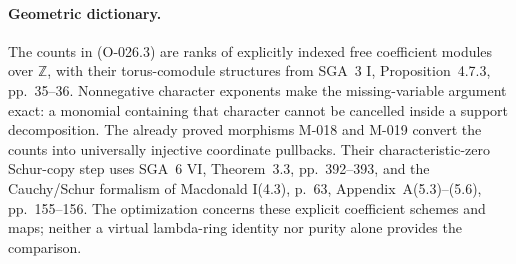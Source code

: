 \paragraph{Geometric dictionary.}
The counts in (O-026.3) are ranks of explicitly indexed
free coefficient modules over $\mathbb Z$, with their
torus-comodule structures from SGA~3 I,
Proposition~4.7.3, pp.~35--36.
Nonnegative character exponents make the missing-variable
argument exact: a monomial containing that character
cannot be cancelled inside a support decomposition.
The already proved morphisms M-018 and M-019 convert
the counts into universally injective coordinate
pullbacks. Their characteristic-zero Schur-copy step
uses SGA~6 VI, Theorem~3.3, pp.~392--393, and the
Cauchy/Schur formalism of Macdonald I(4.3), p.~63,
Appendix~A(5.3)--(5.6), pp.~155--156.
The optimization concerns these explicit coefficient
schemes and maps; neither a virtual lambda-ring identity
nor purity alone provides the comparison.
